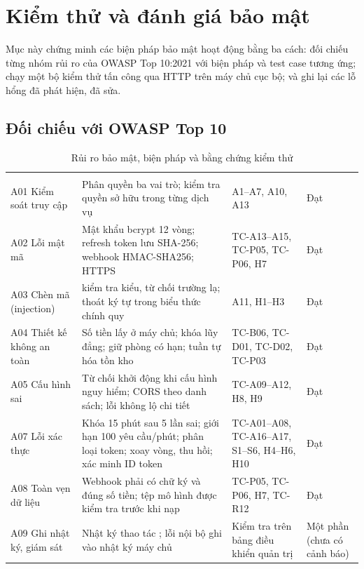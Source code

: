 \section{Kiểm thử và đánh giá bảo mật}\label{sec:test-security}

Mục này chứng minh các biện pháp bảo mật hoạt động bằng ba cách: đối chiếu từng nhóm rủi ro của OWASP Top 10:2021 \cite{owasptop10} với biện pháp và test case tương ứng; chạy một bộ kiểm thử tấn công qua HTTP trên máy chủ cục bộ; và ghi lại các lỗ hổng đã phát hiện, đã sửa.

\subsection{Đối chiếu với OWASP Top 10}

\begin{rtable}
\begin{longtable}{|L{3.3cm}|L{5.6cm}|L{3.9cm}|C{1.9cm}|}
\caption{Rủi ro bảo mật, biện pháp và bằng chứng kiểm thử}\label{tab:security-owasp}\\
\hline
{} &  &  &  \\ \hline
\endfirsthead
\hline
{} &  &  &  \\ \hline
\endhead
A01 Kiểm soát truy cập & Phân quyền ba vai trò; kiểm tra quyền sở hữu trong từng dịch vụ & A1--A7, A10, A13 & Đạt \\ \hline
A02 Lỗi mật mã & Mật khẩu bcrypt 12 vòng; refresh token lưu SHA-256; webhook HMAC-SHA256; HTTPS & TC-A13--A15, TC-P05, TC-P06, H7 & Đạt \\ \hline
A03 Chèn mã (injection) &  kiểm tra kiểu, từ chối trường lạ; thoát ký tự trong biểu thức chính quy & A11, H1--H3 & Đạt \\ \hline
A04 Thiết kế không an toàn & Số tiền lấy ở máy chủ; khóa lũy đẳng; giữ phòng có hạn; tuần tự hóa tồn kho & TC-B06, TC-D01, TC-D02, TC-P03 & Đạt \\ \hline
A05 Cấu hình sai & Từ chối khởi động khi cấu hình nguy hiểm; CORS theo danh sách; lỗi không lộ chi tiết & TC-A09--A12, H8, H9 & Đạt \\ \hline
A07 Lỗi xác thực & Khóa 15 phút sau 5 lần sai; giới hạn 100 yêu cầu/phút; phân loại token; xoay vòng, thu hồi; xác minh ID token & TC-A01--A08, TC-A16--A17, S1--S6, H4--H6, H10 & Đạt \\ \hline
A08 Toàn vẹn dữ liệu & Webhook phải có chữ ký và đúng số tiền; tệp mô hình được kiểm tra trước khi nạp & TC-P05, TC-P06, H7, TC-R12 & Đạt \\ \hline
A09 Ghi nhật ký, giám sát & Nhật ký thao tác ; lỗi nội bộ ghi vào nhật ký máy chủ & Kiểm tra trên bảng điều khiển quản trị & Một phần (chưa có cảnh báo) \\ \hline
\end{longtable}
\end{rtable}

